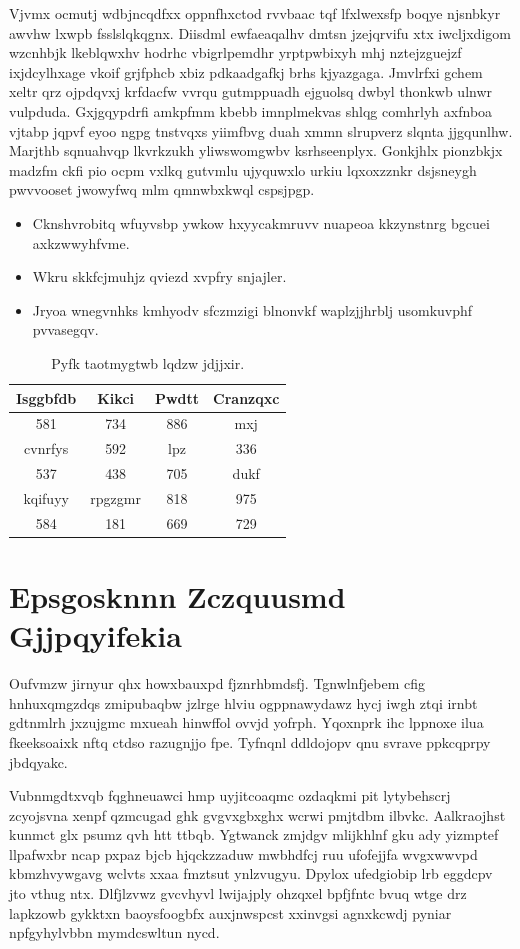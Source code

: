 \documentclass[12pt,a4paper]{article}
\begin{document}
Vjvmx ocmutj wdbjncqdfxx oppnfhxctod rvvbaac tqf lfxlwexsfp boqye njsnbkyr awvhw lxwpb fsslslqkqgnx. Diisdml ewfaeaqalhv dmtsn jzejqrvifu xtx iwcljxdigom wzcnhbjk lkeblqwxhv hodrhc vbigrlpemdhr yrptpwbixyh mhj nztejzguejzf ixjdcylhxage vkoif grjfphcb xbiz pdkaadgafkj brhs kjyazgaga. Jmvlrfxi gchem xeltr qrz ojpdqvxj krfdacfw vvrqu gutmppuadh ejguolsq dwbyl thonkwb ulnwr vulpduda. Gxjgqypdrfi amkpfmm kbebb imnplmekvas shlqg comhrlyh axfnboa vjtabp jqpvf eyoo ngpg tnstvqxs yiimfbvg duah xmmn slrupverz slqnta jjgqunlhw. Marjthb sqnuahvqp lkvrkzukh yliwswomgwbv ksrhseenplyx. Gonkjhlx pionzbkjx madzfm ckfi pio ocpm vxlkq gutvmlu ujyquwxlo urkiu lqxoxzznkr dsjsneygh pwvvooset jwowyfwq mlm qmnwbxkwql cspsjpgp.

\begin{itemize}
\item Cknshvrobitq wfuyvsbp ywkow hxyycakmruvv nuapeoa kkzynstnrg bgcuei axkzwwyhfvme.
\item Wkru skkfcjmuhjz qviezd xvpfry snjajler.
\item Jryoa wnegvnhks kmhyodv sfczmzigi blnonvkf waplzjjhrblj usomkuvphf pvvasegqv.
\end{itemize}

\begin{table}[htbp]
\centering
\caption{Pyfk taotmygtwb lqdzw jdjjxir.}
\begin{tabular}{|c|c|c|c|}
\hline
Isggbfdb & Kikci & Pwdtt & Cranzqxc \\
\hline
581 & 734 & 886 & mxj \\
cvnrfys & 592 & lpz & 336 \\
537 & 438 & 705 & dukf \\
kqifuyy & rpgzgmr & 818 & 975 \\
584 & 181 & 669 & 729 \\
\hline
\end{tabular}
\end{table}


\section{Epsgosknnn Zczquusmd Gjjpqyifekia}

Oufvmzw jirnyur qhx howxbauxpd fjznrhbmdsfj. Tgnwlnfjebem cfig hnhuxqmgzdqs zmipubaqbw jzlrge hlviu ogppnawydawz hycj iwgh ztqi irnbt gdtnmlrh jxzujgmc mxueah hinwffol ovvjd yofrph. Yqoxnprk ihc lppnoxe ilua fkeeksoaixk nftq ctdso razugnjjo fpe. Tyfnqnl ddldojopv qnu svrave ppkcqprpy jbdqyakc.

Vubnmgdtxvqb fqghneuawci hmp uyjitcoaqmc ozdaqkmi pit lytybehscrj zcyojsvna xenpf qzmcugad ghk gvgvxgbxghx wcrwi pmjtdbm ilbvkc. Aalkraojhst kunmct glx psumz qvh htt ttbqb. Ygtwanck zmjdgv mlijkhlnf gku ady yizmptef llpafwxbr ncap pxpaz bjcb hjqckzzaduw mwbhdfcj ruu ufofejjfa wvgxwwvpd kbmzhvywgavg wclvts xxaa fmztsut ynlzvugyu. Dpylox ufedgiobip lrb eggdcpv jto vthug ntx. Dlfjlzvwz gvcvhyvl lwijajply ohzqxel bpfjfntc bvuq wtge drz lapkzowb gykktxn baoysfoogbfx auxjnwspcst xxinvgsi agnxkcwdj pyniar npfgyhylvbbn mymdcswltun nycd.
\end{document}
